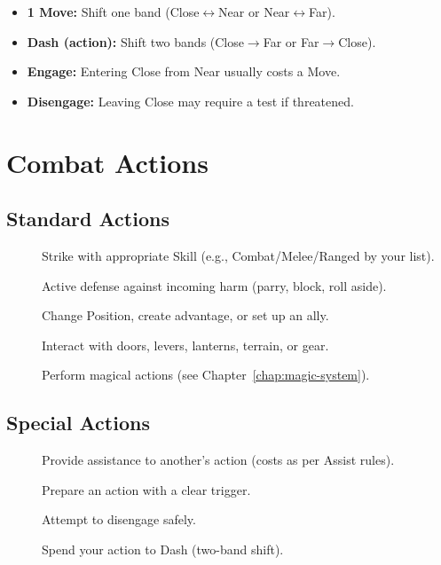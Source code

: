\begin{itemize}
  \item \textbf{1 Move:} Shift one band (Close$\leftrightarrow$Near or Near$\leftrightarrow$Far).
  \item \textbf{Dash (action):} Shift two bands (Close$\rightarrow$Far or Far$\rightarrow$Close).
  \item \textbf{Engage:} Entering Close from Near usually costs a Move.
  \item \textbf{Disengage:} Leaving Close may require a test if threatened.
\end{itemize}

\section{Combat Actions}
\label{sec:combat-actions}

\subsection{Standard Actions}
\label{subsec:standard-actions}

\begin{description}
  \item[] Strike with appropriate Skill (e.g., Combat/Melee/Ranged by your list). 
  \item[] Active defense against incoming harm (parry, block, roll aside). 
  \item[] Change Position, create advantage, or set up an ally. 
  \item[] Interact with doors, levers, lanterns, terrain, or gear. 
  \item[] Perform magical actions (see Chapter~\ref{chap:magic-system}). 
\end{description}

\subsection{Special Actions}
\label{subsec:special-actions}

\begin{description}
  \item[] Provide assistance to another’s action (costs as per Assist rules). 
  \item[] Prepare an action with a clear trigger. 
  \item[] Attempt to disengage safely. 
  \item[] Spend your action to Dash (two-band shift). 
\end{description}

